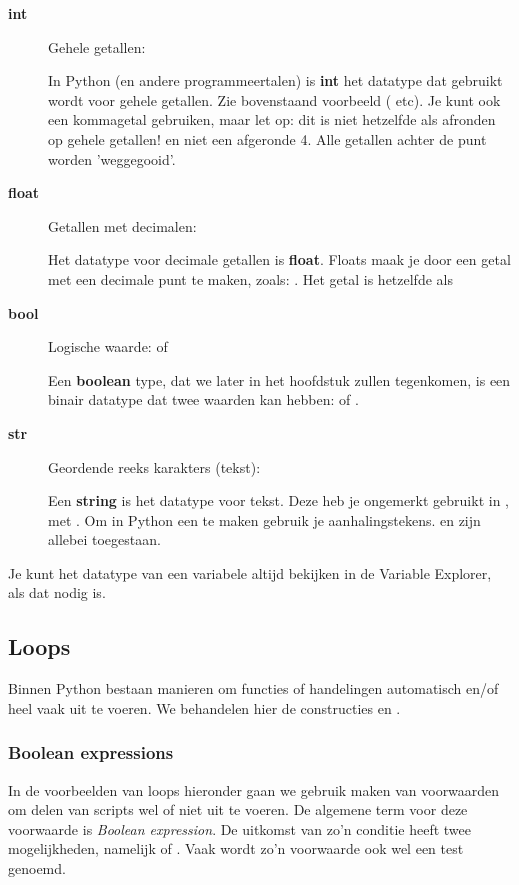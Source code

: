 \documentclass[a4paper,11pt, fleqn]{article}
\begin{document}
\begin{description}
\item[\textbf{int}] Gehele getallen: 

In Python (en andere programmeertalen) is {\bf int} het datatype dat gebruikt wordt voor gehele getallen. Zie bovenstaand voorbeeld ( etc). Je kunt ook een kommagetal gebruiken, maar let op: dit is niet hetzelfde als afronden op gehele getallen!  en niet een afgeronde 4. Alle getallen achter de punt worden 'weggegooid'.

\item[\textbf{float}] Getallen met decimalen: 

Het datatype voor decimale getallen is {\bf float}. Floats maak je door een getal met een decimale punt te maken, zoals: . Het getal  is hetzelfde als 

\item[\textbf{bool}] Logische waarde:  of 

Een {\bf boolean} type, dat we later in het hoofdstuk zullen tegenkomen, is een binair datatype dat twee waarden kan hebben:  of .

\item[\textbf{str}] Geordende reeks karakters (tekst): 

Een {\bf string} is het datatype voor tekst. Deze heb je ongemerkt gebruikt in , met . Om in Python een  te maken gebruik je aanhalingstekens.  en  zijn allebei toegestaan.

\end{description}

Je kunt het datatype van een variabele altijd bekijken in de Variable Explorer, als dat nodig is.

\subsection{Loops}
Binnen Python bestaan manieren om functies of handelingen automatisch en/of heel vaak uit te voeren. We behandelen hier de constructies  en .

\subsubsection{Boolean expressions}
In de voorbeelden van loops hieronder gaan we gebruik maken van voorwaarden om delen van scripts wel of niet uit te voeren. De algemene term voor deze voorwaarde is \textit{Boolean expression}. De uitkomst van zo'n conditie heeft twee mogelijkheden, namelijk  of . Vaak wordt zo'n voorwaarde ook wel een test genoemd.
\end{document}
